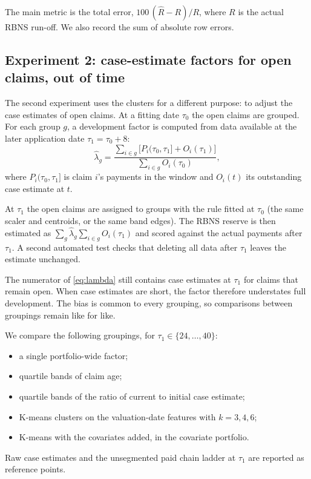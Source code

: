 The main metric is the total error, $100\,(\hat R - R)/R$, where $R$ is the actual RBNS run-off. We also record the sum of absolute row errors.

\subsection{Experiment 2: case-estimate factors for open claims, out of time}
\label{sec:meth-oot}

The second experiment uses the clusters for a different purpose: to adjust the case estimates of open claims. At a fitting date $\tau_0$ the open claims are grouped. For each group $g$, a development factor is computed from data available at the later application date $\tau_1 = \tau_0 + 8$:
\begin{equation}
\hat\lambda_g = \frac{\sum_{i \in g} \bigl[ P_i(\tau_0, \tau_1] + O_i(\tau_1) \bigr]}{\sum_{i \in g} O_i(\tau_0)},
\label{eq:lambda}
\end{equation}
where $P_i(\tau_0,\tau_1]$ is claim $i$'s payments in the window and $O_i(t)$ its outstanding case estimate at $t$.

At $\tau_1$ the open claims are assigned to groups with the rule fitted at $\tau_0$ (the same scaler and centroids, or the same band edges). The RBNS reserve is then estimated as $\sum_g \hat\lambda_g \sum_{i \in g} O_i(\tau_1)$ and scored against the actual payments after $\tau_1$. A second automated test checks that deleting all data after $\tau_1$ leaves the estimate unchanged.

The numerator of \eqref{eq:lambda} still contains case estimates at $\tau_1$ for claims that remain open. When case estimates are short, the factor therefore understates full development. The bias is common to every grouping, so comparisons between groupings remain like for like.

We compare the following groupings, for $\tau_1 \in \{24,\dots,40\}$:
\begin{itemize}[leftmargin=*]
\item a single portfolio-wide factor;
\item quartile bands of claim age;
\item quartile bands of the ratio of current to initial case estimate;
\item K-means clusters on the valuation-date features with $k = 3, 4, 6$;
\item K-means with the covariates added, in the covariate portfolio.
\end{itemize}
Raw case estimates and the unsegmented paid chain ladder at $\tau_1$ are reported as reference points.

